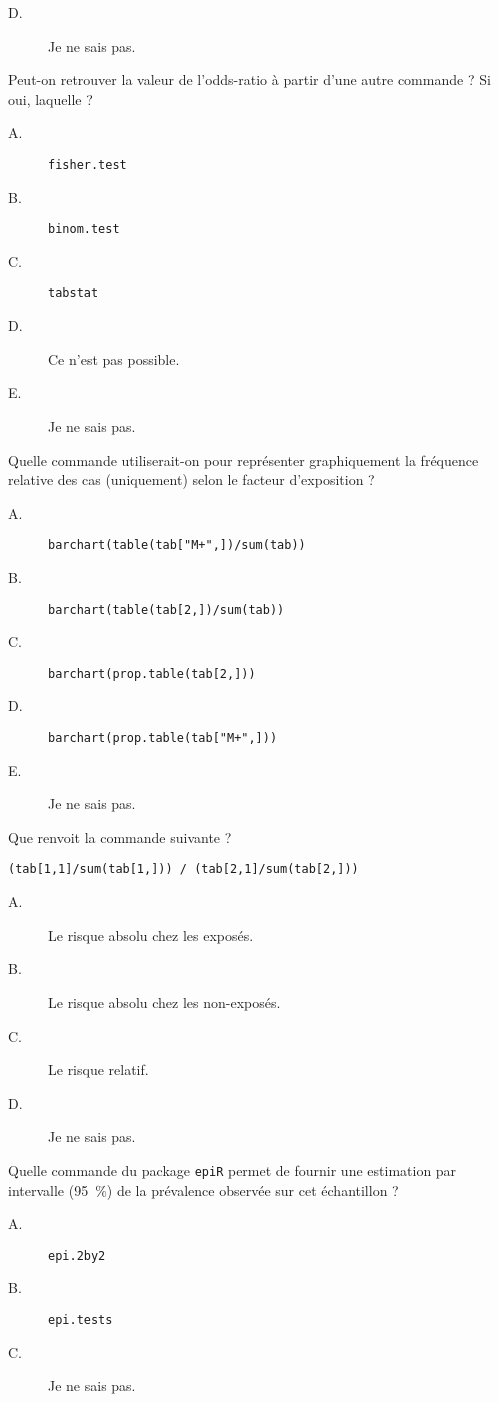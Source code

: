 \documentclass[11pt]{report}
\theoremstyle{definition}
\begin{document}
\begin{description}
\begin{description}
  \item[D.] Je ne sais pas.
  \end{description}  
\item[\bf 1.4]  Peut-on retrouver la valeur de
  l'odds-ratio à partir d'une autre commande ? Si oui, laquelle ?
  \begin{description}
  \item[A.] \verb|fisher.test|
  \item[B.] \verb|binom.test|
  \item[C.] \verb|tabstat|
  \item[D.] Ce n'est pas possible.
  \item[E.] Je ne sais pas.
  \end{description}  
\item[\bf 1.5]  Quelle commande utiliserait-on pour
  représenter graphiquement la fréquence relative des cas (uniquement) selon
  le facteur d'exposition ?
  \begin{description}
  \item[A.] \verb|barchart(table(tab["M+",])/sum(tab))|
  \item[B.] \verb|barchart(table(tab[2,])/sum(tab))|
  \item[C.] \verb|barchart(prop.table(tab[2,]))|
  \item[D.] \verb|barchart(prop.table(tab["M+",]))|
  \item[E.] Je ne sais pas.
  \end{description}  
\item[\bf 1.6]  Que renvoit la commande suivante ? 
\begin{verbatim}
(tab[1,1]/sum(tab[1,])) / (tab[2,1]/sum(tab[2,]))
\end{verbatim}
  \begin{description}
  \item[A.] Le risque absolu chez les exposés.
  \item[B.] Le risque absolu chez les non-exposés.      
  \item[C.] Le risque relatif.
  \item[D.] Je ne sais pas.
  \end{description}
\item[\bf 1.7]  Quelle commande du package
  \texttt{epiR} permet de fournir une estimation par intervalle (95~\%) de
  la prévalence observée sur cet échantillon ?
  \begin{description}
  \item[A.] \verb|epi.2by2|
  \item[B.] \verb|epi.tests|
  \item[C.] Je ne sais pas.
  \end{description}  
\end{description}
\end{document}
